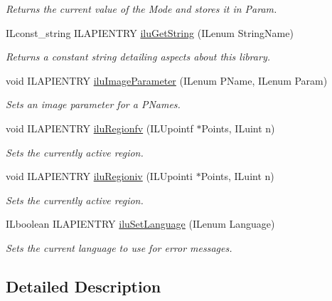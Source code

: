 \begin{DoxyCompactItemize}
\begin{DoxyCompactList}\small\item\em Returns the current value of the {\itshape Mode} and stores it in {\itshape Param}. \end{DoxyCompactList}\item 
I\-Lconst\-\_\-string I\-L\-A\-P\-I\-E\-N\-T\-R\-Y \hyperlink{group__ilu__state_ga8c572ee3c422dfcc4991aeff712d1804}{ilu\-Get\-String} (I\-Lenum String\-Name)
\begin{DoxyCompactList}\small\item\em Returns a constant string detailing aspects about this library. \end{DoxyCompactList}\item 
void I\-L\-A\-P\-I\-E\-N\-T\-R\-Y \hyperlink{group__ilu__state_ga1f7db294cdcd2a8285ae24c29bb1f750}{ilu\-Image\-Parameter} (I\-Lenum P\-Name, I\-Lenum Param)
\begin{DoxyCompactList}\small\item\em Sets an image parameter for a {\itshape P\-Names}. \end{DoxyCompactList}\item 
void I\-L\-A\-P\-I\-E\-N\-T\-R\-Y \hyperlink{group__ilu__state_gaa26c0daed6573bf4a1c8f8146de2dbfc}{ilu\-Regionfv} (I\-L\-Upointf $\ast$Points, I\-Luint n)
\begin{DoxyCompactList}\small\item\em Sets the currently active region. \end{DoxyCompactList}\item 
void I\-L\-A\-P\-I\-E\-N\-T\-R\-Y \hyperlink{group__ilu__state_gaf22304a1fa0728ee5fadf4d92effdb50}{ilu\-Regioniv} (I\-L\-Upointi $\ast$Points, I\-Luint n)
\begin{DoxyCompactList}\small\item\em Sets the currently active region. \end{DoxyCompactList}\item 
I\-Lboolean I\-L\-A\-P\-I\-E\-N\-T\-R\-Y \hyperlink{group__ilu__state_ga4c2e7c06c4a5677dbe58cba9c5ed075e}{ilu\-Set\-Language} (I\-Lenum Language)
\begin{DoxyCompactList}\small\item\em Sets the current language to use for error messages. \end{DoxyCompactList}\end{DoxyCompactItemize}


\subsection{Detailed Description}


